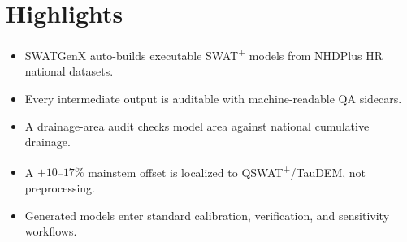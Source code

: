 \section*{Highlights}
\begin{itemize}
  \item SWATGenX auto-builds executable SWAT\textsuperscript{+} models from NHDPlus HR national datasets.
  \item Every intermediate output is auditable with machine-readable QA sidecars.
  \item A drainage-area audit checks model area against national cumulative drainage.
  \item A $+10$--$17\%$ mainstem offset is localized to QSWAT\textsuperscript{+}/TauDEM, not preprocessing.
  \item Generated models enter standard calibration, verification, and sensitivity workflows.
\end{itemize}
